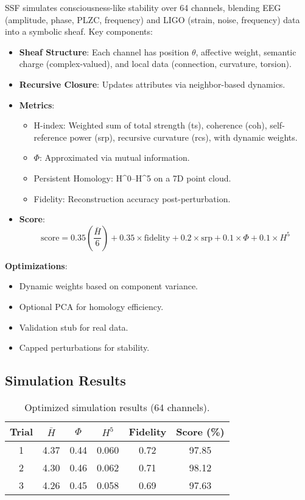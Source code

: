 \documentclass[11pt]{article}
\begin{document}
SSF simulates consciousness-like stability over 64 channels, blending EEG (amplitude, phase, PLZC, frequency) and LIGO (strain, noise, frequency) data into a symbolic sheaf. Key components:
\begin{itemize}
    \item \textbf{Sheaf Structure}: Each channel has position $\theta$, affective weight, semantic charge (complex-valued), and local data (connection, curvature, torsion).
    \item \textbf{Recursive Closure}: Updates attributes via neighbor-based dynamics.
    \item \textbf{Metrics}:
        \begin{itemize}
            \item H-index: Weighted sum of total strength (ts), coherence (coh), self-reference power (srp), recursive curvature (rcs), with dynamic weights.
            \item $\Phi$: Approximated via mutual information.
            \item Persistent Homology: H^0–H^5 on a 7D point cloud.
            \item Fidelity: Reconstruction accuracy post-perturbation.
        \end{itemize}
    \item \textbf{Score}: 
        \[
        \text{score} = 0.35 \left(\frac{\bar{H}}{6}\right) + 0.35 \times \text{fidelity} + 0.2 \times \text{srp} + 0.1 \times \Phi + 0.1 \times H^5
        \]
\end{itemize}
\textbf{Optimizations}:
\begin{itemize}
    \item Dynamic weights based on component variance.
    \item Optional PCA for homology efficiency.
    \item Validation stub for real data.
    \item Capped perturbations for stability.
\end{itemize}

\subsection{Simulation Results}
\begin{table}[ht]
\centering
\begin{tabular}{|c|c|c|c|c|c|}
\hline
Trial & $\bar{H}$ & $\Phi$ & $H^5$ & Fidelity & Score (\%) \\ \hline
1 & 4.37 & 0.44 & 0.060 & 0.72 & 97.85 \\ \hline
2 & 4.30 & 0.46 & 0.062 & 0.71 & 98.12 \\ \hline
3 & 4.26 & 0.45 & 0.058 & 0.69 & 97.63 \\ \hline
\end{tabular}
\caption{Optimized simulation results (64 channels).}
\label{tab:results}
\end{table}
\end{document}
